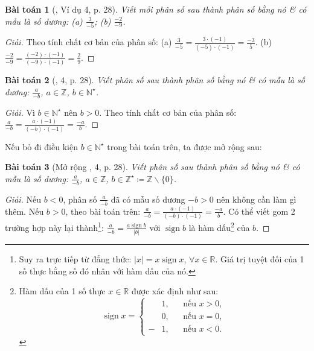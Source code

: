\documentclass{article}
\newtheorem{baitoan}{Bài toán}
\begin{document}
\begin{baitoan}[\cite{SGK_Toan_6_Canh_Dieu_tap_2}, Ví dụ 4, p. 28]
	Viết mỗi phân số sau thành phân số bằng nó \& có mẫu là số dương: (a) $\frac{3}{-5}$; (b) $\frac{-2}{-9}$.
\end{baitoan}

\begin{proof}[Giải]
	Theo tính chất cơ bản của phân số: (a) $\frac{3}{-5} = \frac{3\cdot(-1)}{(-5)\cdot(-1)} = \frac{-3}{5}$. (b) $\frac{-2}{-9} = \frac{(-2)\cdot(-1)}{(-9)\cdot(-1)} = \frac{2}{9}$.
\end{proof}

\begin{baitoan}[\cite{SGK_Toan_6_Canh_Dieu_tap_2}, 4, p. 28]
	Viết phân số sau thành phân số bằng nó \& có mẫu là số dương: $\frac{a}{-b}$, $a\in\mathbb{Z}$, $b\in\mathbb{N}^\star$.
\end{baitoan}

\begin{proof}[Giải]
	Vì $b\in\mathbb{N}^\star$ nên $b > 0$. Theo tính chất cơ bản của phân số: $\frac{a}{-b} = \frac{a\cdot(-1)}{(-b)\cdot(-1)} = \frac{-a}{b}$.
\end{proof}
Nếu bỏ đi điều kiện $b\in\mathbb{N}^\star$ trong bài toán trên, ta được mở rộng sau:

\begin{baitoan}[Mở rộng \cite{SGK_Toan_6_Canh_Dieu_tap_2}, 4, p. 28]
	Viết phân số sau thành phân số bằng nó \& có mẫu là số dương: $\frac{a}{-b}$, $a\in\mathbb{Z}$, $b\in\mathbb{Z}^\star\coloneqq\mathbb{Z}\backslash\{0\}$.
\end{baitoan}

\begin{proof}[Giải]
	Nếu $b < 0$, phân số $\frac{a}{-b}$ đã có mẫu số dương $-b > 0$ nên không cần làm gì thêm. Nếu $b > 0$, theo bài toán trên: $\frac{a}{-b} = \frac{a\cdot(-1)}{(-b)\cdot(-1)} = \frac{-a}{b}$. Có thể viết gom 2 trường hợp này lại thành\footnote{Suy ra trực tiếp từ đẳng thức: $|x| = x\operatorname{sign}x$, $\forall x\in\mathbb{R}$. Giá trị tuyệt đối của 1 số thực bằng số đó nhân với hàm dấu của nó.}: $\frac{a}{-b} = \frac{a\operatorname{sign}b}{|b|}$ với $\operatorname{sign}b$ là hàm dấu\footnote{Hàm dấu của 1 số thực $x\in\mathbb{R}$ được xác định như sau:
	\begin{equation*}
		\operatorname{sign}x = \left\{\begin{split}
			&1,&&\mbox{nếu } x > 0,\\
			&0,&&\mbox{nếu } x = 0,\\
			-&1,&&\mbox{nếu } x < 0.
		\end{split}\right.
	\end{equation*}} của $b$.
\end{proof}
\end{document}
